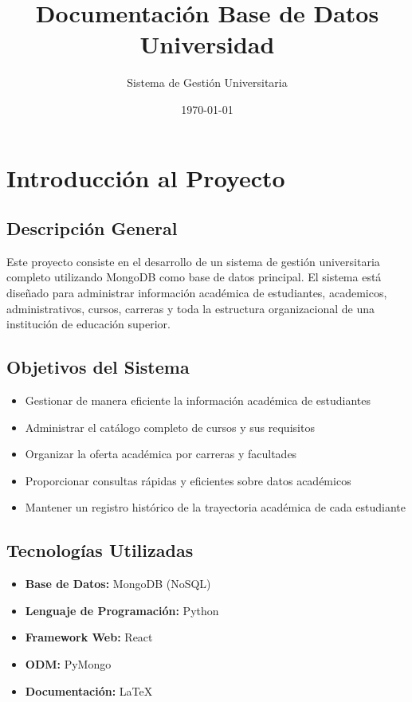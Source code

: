 \documentclass[12pt,a4paper]{article}
\title{\textbf{Documentación Base de Datos Universidad}}
\author{Sistema de Gestión Universitaria}
\date{\today}
\begin{document}
	
	\maketitle
	\tableofcontents
	\newpage
	
	\section{Introducción al Proyecto}
	
	\subsection{Descripción General}
	Este proyecto consiste en el desarrollo de un sistema de gestión universitaria completo utilizando MongoDB como base de datos principal. El sistema está diseñado para administrar información académica de estudiantes, academicos, administrativos, cursos, carreras y toda la estructura organizacional de una institución de educación superior.
	
	\subsection{Objetivos del Sistema}
	\begin{itemize}
		\item Gestionar de manera eficiente la información académica de estudiantes
		\item Administrar el catálogo completo de cursos y sus requisitos
		\item Organizar la oferta académica por carreras y facultades
		\item Proporcionar consultas rápidas y eficientes sobre datos académicos
		\item Mantener un registro histórico de la trayectoria académica de cada estudiante
	\end{itemize}
	
	\subsection{Tecnologías Utilizadas}
	\begin{itemize}
		\item \textbf{Base de Datos:} MongoDB (NoSQL)
		\item \textbf{Lenguaje de Programación:} Python
		\item \textbf{Framework Web:} React
		\item \textbf{ODM:} PyMongo
		\item \textbf{Documentación:} LaTeX
	\end{itemize}
	
\end{document}
